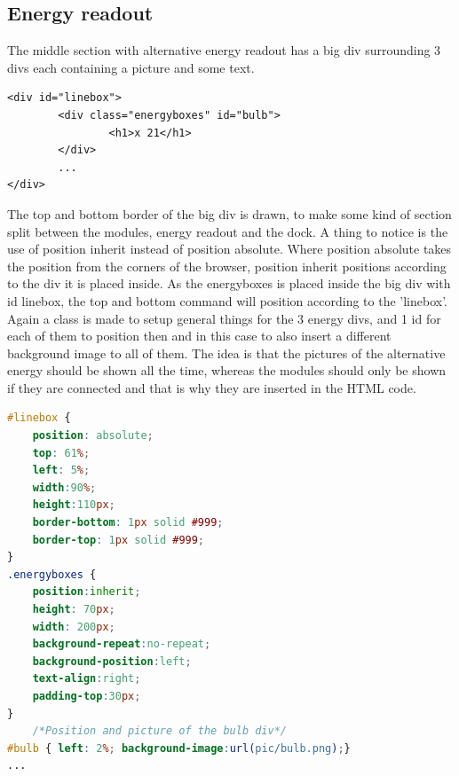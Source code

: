 \subsection{Energy readout}
The middle section with alternative energy readout has a big div surrounding 3 divs each containing a picture and some text.
\begin{lstlisting}
<div id="linebox">
		<div class="energyboxes" id="bulb">
				<h1>x 21</h1>
		</div>
		...
</div>
\end{lstlisting}
The top and bottom border of the big div is drawn, to make some kind of section split between the modules, energy readout and the dock. A thing to notice is the use of position inherit instead of position absolute. Where position absolute takes the position from the corners of the browser, position inherit positions according to the div it is placed inside. As the energyboxes is placed inside the big div with id linebox, the top and bottom command will position according to the 'linebox'. Again a class is made to setup general things for the 3 energy divs, and 1 id for each of them to position then and in this case to also insert a different background image to all of them. The idea is that the pictures of the alternative energy should be shown all the time, whereas the modules should only be shown if they are connected and that is why they are inserted in the HTML code.
\begin{lstlisting}[language=CSS]
#linebox {
	position: absolute;
	top: 61%;
	left: 5%;
	width:90%;
	height:110px;
	border-bottom: 1px solid #999;
	border-top: 1px solid #999;
}
.energyboxes {
	position:inherit;
	height: 70px;
	width: 200px;
	background-repeat:no-repeat;
	background-position:left;
	text-align:right;
	padding-top:30px;
}
	/*Position and picture of the bulb div*/
#bulb { left: 2%; background-image:url(pic/bulb.png);}
...
\end{lstlisting}


